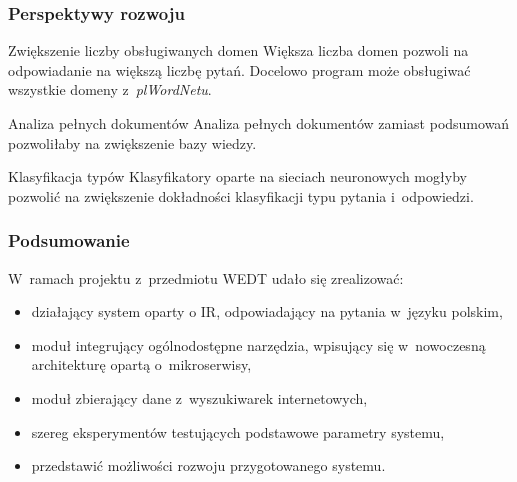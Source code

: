 \documentclass{beamer}
\begin{document}
\begin{frame}
  \frametitle{Perspektywy rozwoju}
  \begin{block}{Zwiększenie liczby obsługiwanych domen}
    Większa liczba domen pozwoli na odpowiadanie na większą liczbę pytań. Docelowo program może obsługiwać wszystkie domeny z~\textit{plWordNetu}.
  \end{block}

  \begin{block}{Analiza pełnych dokumentów}
    Analiza pełnych dokumentów zamiast podsumowań pozwoliłaby na zwiększenie bazy wiedzy.
  \end{block}

  \begin{block}{Klasyfikacja typów}
    Klasyfikatory oparte na sieciach neuronowych mogłyby pozwolić na zwiększenie dokładności klasyfikacji typu pytania i~odpowiedzi.
  \end{block}

\end{frame}

\begin{frame}
  \frametitle{Podsumowanie}
  W~ramach projektu z~przedmiotu WEDT udało się zrealizować:
  \begin{itemize}
    \item działający system oparty o IR, odpowiadający na pytania w~języku polskim,
    \item moduł integrujący ogólnodostępne narzędzia, wpisujący się w~nowoczesną architekturę opartą o~mikroserwisy,
    \item moduł zbierający dane z~wyszukiwarek internetowych,
    \item szereg eksperymentów testujących podstawowe parametry systemu,
    \item przedstawić możliwości rozwoju przygotowanego systemu.
  \end{itemize}

\end{frame}
\end{document}
